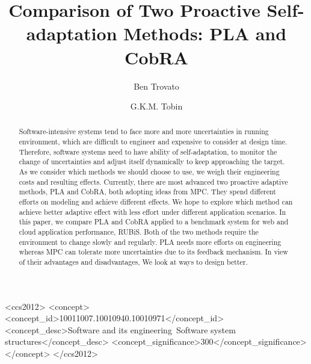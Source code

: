 \documentclass[sigconf]{acmart}
\begin{document}
\title{Comparison of Two Proactive Self-adaptation Methods: PLA and CobRA}


\author{Ben Trovato}
\author{G.K.M. Tobin}
\authornotemark[1]

\author{}

\author{}
%
%

\begin{abstract}
Software-intensive systems tend to face more and more uncertainties in running environment, which are difficult to  engineer and expensive to consider at design time. Therefore, software systems need to have ability of self-adaptation, to monitor the change of uncertainties and adjust itself dynamically to keep approaching the target. As we consider which methods we should choose to use, we weigh their engineering costs and resulting effects. Currently, there are most advanced two proactive adaptive methods, PLA  and CobRA, both adopting ideas from MPC. They spend different efforts on modeling and achieve different effects. We hope to explore which method can achieve better adaptive effect with less effort under different application scenarios. In this paper, we compare PLA and CobRA applied to a benchmark system for web and cloud application performance, RUBiS. Both of the two methods require the environment to change slowly and regularly. PLA needs more efforts on engineering whereas MPC can tolerate more uncertainties due to its feedback mechanism. In view of their advantages and disadvantages, We look at ways to design better.
\end{abstract}

\begin{CCSXML}
	<ccs2012>
	<concept>
	<concept_id>10011007.10010940.10010971</concept_id>
	<concept_desc>Software and its engineering~Software system structures</concept_desc>
	<concept_significance>300</concept_significance>
	</concept>
	</ccs2012>
\end{CCSXML}
\end{document}
